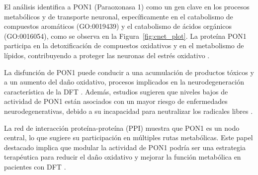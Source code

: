 El análisis identifica a PON1 (Paraoxonasa 1) como un gen clave en los procesos metabólicos y de transporte neuronal, específicamente en el catabolismo de compuestos aromáticos (GO:0019439) y el catabolismo de ácidos orgánicos (GO:0016054), como se observa en la Figura~\ref{fig:cnet_plot}. La proteína PON1 participa en la detoxificación de compuestos oxidativos y en el metabolismo de lípidos, contribuyendo a proteger las neuronas del estrés oxidativo \cite{costa2005paraoxonase}.

La disfunción de PON1 puede conducir a una acumulación de productos tóxicos y a un aumento del daño oxidativo, procesos implicados en la neurodegeneración característica de la DFT \cite{kim2006paraoxonase}. Además, estudios sugieren que niveles bajos de actividad de PON1 están asociados con un mayor riesgo de enfermedades neurodegenerativas, debido a su incapacidad para neutralizar los radicales libres \cite{brophy2001paraoxonase}.

La red de interacción proteína-proteína (PPI) muestra que PON1 es un nodo central, lo que sugiere su participación en múltiples rutas metabólicas. Este papel destacado implica que modular la actividad de PON1 podría ser una estrategia terapéutica para reducir el daño oxidativo y mejorar la función metabólica en pacientes con DFT \cite{james2009paraoxonase}.

